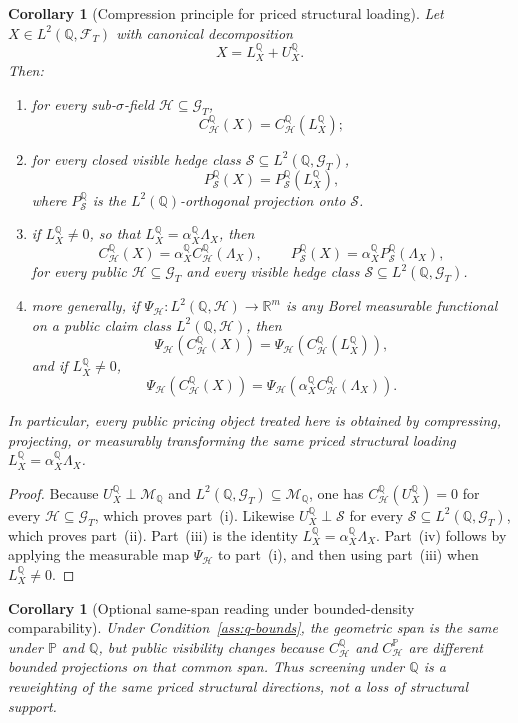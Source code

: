 \documentclass[11pt,a4paper]{amsart}
\theoremstyle{plain}
\newtheorem{corollary}[theorem]{Corollary}
\theoremstyle{definition}
\theoremstyle{remark}
\newcommand{\R}{\mathbb{R}}
\newcommand{\PP}{\mathbb{P}}
\newcommand{\QQ}{\mathbb{Q}}
\newcommand{\cF}{\mathcal{F}}
\newcommand{\cG}{\mathcal{G}}
\newcommand{\cH}{\mathcal{H}}
\newcommand{\cM}{\mathcal{M}}
\newcommand{\cS}{\mathcal{S}}
\begin{document}
\begin{corollary}[Compression principle for priced structural loading]\label{prop:compression-unifier}
Let \(X\in L^2(\QQ,\cF_T)\) with canonical decomposition
\[
        X=L_X^\QQ+U_X^\QQ.
\]
Then:
\begin{enumerate}[label=(\roman*)]
\item for every sub-\(\sigma\)-field \(\cH\subseteq \cG_T\),
\[
        C_{\cH}^{\QQ}(X)
        =
        C_{\cH}^{\QQ}(L_X^\QQ);
\]
\item for every closed visible hedge class \(\cS\subseteq L^2(\QQ,\cG_T)\),
\[
        P_{\cS}^{\QQ}(X)
        =
        P_{\cS}^{\QQ}(L_X^\QQ),
\]
where \(P_{\cS}^{\QQ}\) is the \(L^2(\QQ)\)-orthogonal projection onto \(\cS\).
\item if \(L_X^\QQ\neq0\), so that \(L_X^\QQ=\alpha_X^\QQ\Lambda_X\), then
\[
        C_{\cH}^{\QQ}(X)=\alpha_X^\QQ C_{\cH}^{\QQ}(\Lambda_X),
        \qquad
        P_{\cS}^{\QQ}(X)=\alpha_X^\QQ P_{\cS}^{\QQ}(\Lambda_X),
\]
for every public \(\cH\subseteq \cG_T\) and every visible hedge class
\(\cS\subseteq L^2(\QQ,\cG_T)\).
\item more generally, if \(\Psi_{\cH}\colon L^2(\QQ,\cH)\to\R^m\) is any Borel measurable
functional on a public claim class \(L^2(\QQ,\cH)\), then
\[
        \Psi_{\cH}(C_{\cH}^{\QQ}(X))
        =
        \Psi_{\cH}(C_{\cH}^{\QQ}(L_X^\QQ)),
\]
and if \(L_X^\QQ\neq0\),
\[
        \Psi_{\cH}(C_{\cH}^{\QQ}(X))
        =
        \Psi_{\cH}(\alpha_X^\QQ C_{\cH}^{\QQ}(\Lambda_X)).
\]
\end{enumerate}
In particular, every public pricing object treated here is obtained by compressing,
projecting, or measurably transforming the same priced structural loading \(L_X^\QQ=\alpha_X^\QQ\Lambda_X\).
\end{corollary}

\begin{proof}
Because \(U_X^\QQ\perp \cM_\QQ\) and \(L^2(\QQ,\cG_T)\subseteq \cM_\QQ\), one has
\(C_{\cH}^{\QQ}(U_X^\QQ)=0\) for every \(\cH\subseteq \cG_T\), which proves part~(i).  Likewise
\(U_X^\QQ\perp\cS\) for every \(\cS\subseteq L^2(\QQ,\cG_T)\), which proves part~(ii).
Part~(iii) is the identity \(L_X^\QQ=\alpha_X^\QQ\Lambda_X\).  Part~(iv) follows by applying the
measurable map \(\Psi_{\cH}\) to part~(i), and then using part~(iii) when \(L_X^\QQ\neq0\).
\end{proof}

\begin{corollary}[Optional same-span reading under bounded-density comparability]\label{cor:compression-same-span}
Under Condition~\ref{ass:q-bounds}, the geometric span is the same under \(\PP\) and \(\QQ\), but
public visibility changes because \(C_{\cH}^{\QQ}\) and \(C_{\cH}^{\PP}\) are different bounded
projections on that common span.  Thus screening under \(\QQ\) is a reweighting of the same priced
structural directions, not a loss of structural support.
\end{corollary}
\end{document}
